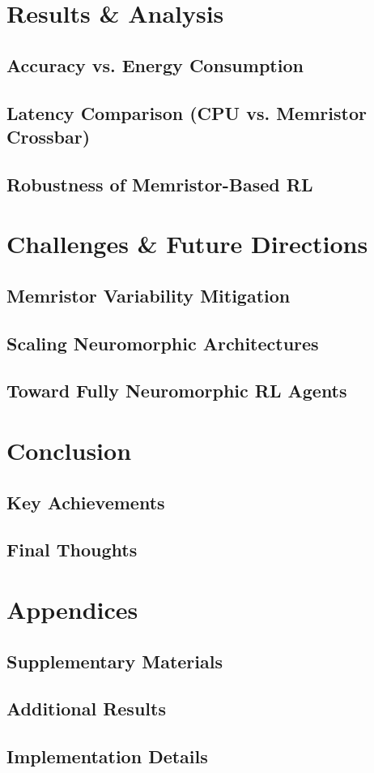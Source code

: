 \chapter{Results \& Analysis}
\section{Accuracy vs. Energy Consumption}
\section{Latency Comparison (CPU vs. Memristor Crossbar)}
\section{Robustness of Memristor-Based RL}

\chapter{Challenges \& Future Directions}
\section{Memristor Variability Mitigation}
\section{Scaling Neuromorphic Architectures}
\section{Toward Fully Neuromorphic RL Agents}

\chapter{Conclusion}
\section{Key Achievements}
\section{Final Thoughts}

\appendix
\chapter{Appendices}
\section{Supplementary Materials}
\section{Additional Results}
\section{Implementation Details}